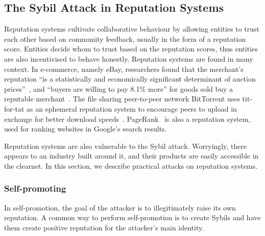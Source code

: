 \subsection{The Sybil Attack in Reputation Systems}
\label{sec:reputation-attack}
Reputation systems cultivate collaborative behaviour by allowing entities to
trust each other based on community feedback, usually in the form of a
reputation score. Entities decide whom to trust based on the reputation scores,
thus entities are also incentivised to behave honestly. Reputation systems are
found in many context. In e-commerce, namely eBay, researchers found that the
merchant's reputation ``is a statistically and economically significant
determinant of auction prices''~\cite{houser2006reputation}, and ``buyers are
willing to pay 8.1\% more'' for goods sold buy a reputable
merchant~\cite{resnick2006value}. The file sharing peer-to-peer network
BitTorrent uses tit-for-tat as an ephemeral reputation system to encourage peers
to upload in exchange for better download speeds~\cite{cohen2003incentives}.
PageRank~\cite{page1999pagerank} is also a reputation system, used for ranking
websites in Google's search results.

Reputation systems are also vulnerable to the Sybil attack. Worryingly, there
appears to an industry built around it, and their products are easily accessible
in the clearnet. In this section, we describe practical attacks on reputation
systems.

\subsubsection{Self-promoting}
In self-promotion, the goal of the attacker is to illegitimately raise its own
reputation. A common way to perform self-promotion is to create Sybils and have
them create positive reputation for the attacker's main identity.

\begin{comment}
Dini and Spagnolo studied the economics of buying reputation on eBay. The
authors discovered many cheap items (around \euro{0.7}) for sell are simply there to
boost feedback. For example, one of the item is titled ``Apple Cranberry Crisp
Recipe + 100\% Positive Feedback''. The authors successfully boosted their
feedback by purchasing such items. But they made an unsuccessful attempted to
place a bid on their own good with a fake account~\cite{dini2009buying}.
\end{comment}


